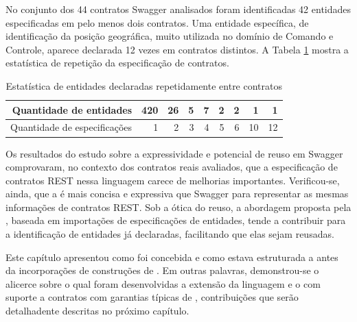 No conjunto dos 44 contratos Swagger analisados foram identificadas 42 entidades
especificadas em pelo menos dois contratos. Uma entidade específica, de
identificação da posição geográfica, muito utilizada no domínio de Comando e Controle, aparece
declarada 12 vezes em contratos distintos. A Tabela \ref{estatisticaEntidades}
mostra a estatística de repetição da especificação de contratos.
 
\begin{table}[!bth] 
\centering
\vspace{0.5cm}
\footnotesize
\begin{tabular}{|r|r|r|r|r|r|r|r|r|}
\hline   
Quantidade de entidades & 420 & 26 & 5 & 7 & 2 & 2 & 1 & 1 \\
\hline
Quantidade de especificações & 1 & 2 & 3 & 4 & 5 & 6 & 10 & 12 \\
\hline

\end{tabular}
\caption{Estatística de entidades declaradas repetidamente entre contratos}
\label{estatisticaEntidades}
\end{table}

Os resultados do estudo sobre a expressividade e potencial de reuso em Swagger
comprovaram, no contexto dos contratos reais avaliados, que a especificação de
contratos REST nessa linguagem carece de melhorias importantes. Verificou-se,
ainda, que a \neoidl{} é mais concisa e expressiva que Swagger para representar
as mesmas informações de contratos REST. Sob a ótica do reuso, a abordagem proposta pela
\neoidl{}, baseada em importações de especificações de entidades, tende a
contribuir para a identificação de entidades já declaradas, facilitando que
elas sejam reusadas.

Este capítulo apresentou como foi concebida e como estava estruturada a
\neoidl{} antes da incorporações de construções de \designbycontract{}. Em
outras palavras, demonstrou-se o alicerce sobre o qual foram
desenvolvidas a extensão da linguagem e o \framework{} \neoidl{} com suporte a
contratos com garantias típicas de \designbycontract{}, contribuições que serão
detalhadente descritas no próximo capítulo.
